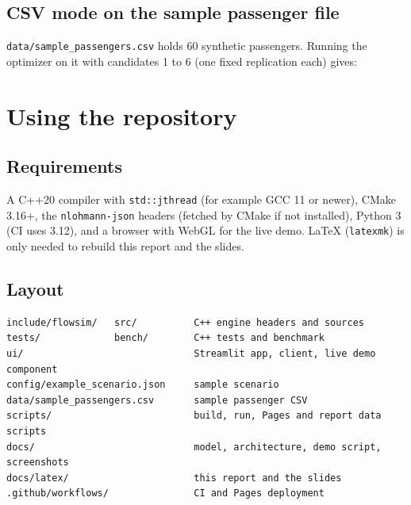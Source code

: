 \documentclass[11pt,a4paper]{article}
\newcommand{\code}[1]{\texttt{#1}}
\begin{document}
\subsection{CSV mode on the sample passenger file}
\code{data/sample\_passengers.csv} holds 60 synthetic passengers. Running the optimizer on it with candidates 1 to 6 (one
fixed replication each) gives:
\begin{table}[H]\centering\small
{}
\caption{CSV mode results. The minimum is at 4 counters.}\end{table}

\section{Using the repository}
\subsection{Requirements}
{\sloppy A C++20 compiler with \code{std::jthread} (for example GCC 11 or newer),
CMake 3.16+, the \code{nlohmann-json} headers (fetched by CMake if not
installed), Python 3 (CI uses 3.12), and a browser with WebGL for the live demo. \LaTeX{} (\code{latexmk}) is only needed to
rebuild this report and the slides.\par}

\subsection{Layout}
\begin{lstlisting}
include/flowsim/   src/          C++ engine headers and sources
tests/             bench/        C++ tests and benchmark
ui/                              Streamlit app, client, live demo component
config/example_scenario.json     sample scenario
data/sample_passengers.csv       sample passenger CSV
scripts/                         build, run, Pages and report data scripts
docs/                            model, architecture, demo script, screenshots
docs/latex/                      this report and the slides
.github/workflows/               CI and Pages deployment
\end{lstlisting}
\end{document}
